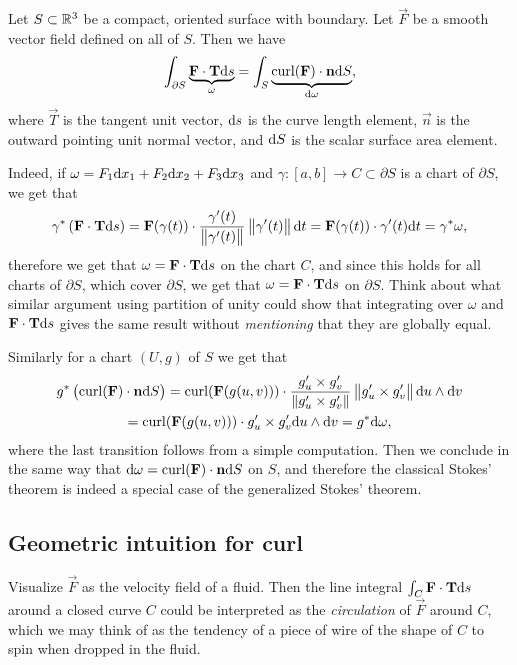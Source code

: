 \documentclass[11pt,a4paper]{article}
\begin{document}
\begin{theorem}
  \label{thm:stokes}
  Let $S \subset \mathbb{R}^3$ be a compact, oriented surface with boundary.
  Let $\vec F$ be a smooth vector field defined on all of $S$.
  Then we have
  \[
    \int_{\partial S} \underbrace{\boldsymbol{\mathbf{F}} \cdot \boldsymbol{\mathbf{T}} \mathrm{d} s}_{\omega} =
    \int_{S} \underbrace{\operatorname{curl}(\boldsymbol{\mathbf{F}}) \cdot \boldsymbol{\mathbf{n}} \mathrm{d} S}_{\mathrm{d} \omega},
  \]
  where $\vec T$ is the tangent unit vector,
  $\mathrm{d} s$ is the curve length element,
  $\vec n$ is the outward pointing unit normal vector,
  and $\mathrm{d} S$ is the scalar surface area element.
\end{theorem}

\begin{remark}
  Indeed, if $\omega = F_1 \dx_1 + F_2 \dx_2 + F_3 \dx_3$
  and $\gamma \colon [a,b] \to C \subset \partial S$
  is a chart of $\partial S$, we get that
  \[
    \gamma^*\del{\vec F \cdot \vec T \ds} =
    \vec F(\gamma(t)) \cdot \frac{\gamma'(t)}{\norm{\gamma'(t)}} 
      \norm{\gamma'(t)} \dt =
    \vec F(\gamma(t)) \cdot \gamma'(t) \dt =
    \gamma^*\omega,
  \]
  therefore we get that $\omega = \boldsymbol{\mathbf{F}} \cdot \boldsymbol{\mathbf{T}} \mathrm{d} s$ on
  the chart $C$, and since this holds for all charts of $\partial S$,
  which cover $\partial S$, we get that $\omega = \boldsymbol{\mathbf{F}} \cdot \boldsymbol{\mathbf{T}} \mathrm{d} s$
  on $\partial S$.
  Think about what similar argument using partition of unity could show
  that integrating over $\omega$ and $\boldsymbol{\mathbf{F}} \cdot \boldsymbol{\mathbf{T}} \mathrm{d} s$ gives
  the same result without \textit{mentioning} that they are globally equal.
  
  Similarly for a chart $(U,g)$ of $S$ we get that
  \begin{multline*}
    g^*\del{\curl(\vec F) \cdot \vec n \dS} =
    \curl(\vec F(g(u,v))) \cdot
    \frac{g'_u \times g'_v}{\norm{g'_u \times g'_v}} \norm{g'_u \times g'_v}
    \du \wedge \dv \\ =
    \curl(\vec F(g(u,v))) \cdot g'_u \times g'_v \du \wedge \dv =
    g^*\dif \omega,
  \end{multline*}
  where the last transition follows from a simple computation.
  Then we conclude in the same way
  that $\mathrm{d} \omega = \operatorname{curl}(\boldsymbol{\mathbf{F}}) \cdot \boldsymbol{\mathbf{n}} \mathrm{d} S$ on $S$,
  and therefore the classical Stokes' theorem is indeed a special case
  of the generalized Stokes' theorem.
\end{remark}

\subsection{Geometric intuition for curl}
\label{sec:curl-intuition}
Visualize $\vec F$ as the velocity field of a fluid.
Then the line integral $\int_{C} \boldsymbol{\mathbf{F}} \cdot \boldsymbol{\mathbf{T}} \mathrm{d} s$ around a closed
curve $C$ could be interpreted as the \textit{circulation} of $\vec F$
around $C$, which we may think of as the tendency of a piece of wire
of the shape of $C$ to spin when dropped in the fluid.
\end{document}
